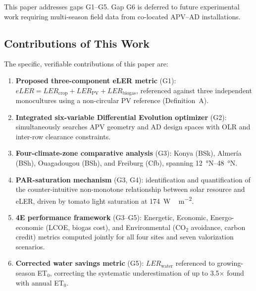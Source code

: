 This paper addresses gaps G1--G5. Gap G6 is deferred to future
experimental work requiring multi-season field data from co-located
APV--AD installations.

\subsection{Contributions of This Work}

\hspace{1cm}The specific, verifiable contributions of this paper are:

\begin{enumerate}[leftmargin=*, label=\textbf{C\arabic*:}]

    \item \textbf{Proposed three-component eLER metric} (G1): $eLER =
    LER_{\text{crop}} + LER_{\text{PV}} + LER_{\text{biogas}}$,
    referenced against three independent monocultures using a
    non-circular PV reference (Definition~A).

    \item \textbf{Integrated six-variable Differential Evolution optimizer}
    (G2): simultaneously searches APV geometry and AD design spaces
    with OLR and inter-row clearance constraints.

    \item \textbf{Four-climate-zone comparative analysis} (G3): Konya
    (BSk), Almer\'{i}a (BSh), Ouagadougou (BSh), and Freiburg (Cfb),
    spanning \SI{12}{\degree}N--\SI{48}{\degree}N.

    \item \textbf{PAR-saturation mechanism} (G3, G4): identification
    and quantification of the counter-intuitive non-monotone relationship
    between solar resource and eLER, driven by tomato light saturation
    at \SI{174}{W\,m^{-2}}.

    \item \textbf{4E performance framework} (G3--G5): Energetic,
    Economic, Energo-economic (LCOE, biogas cost), and Environmental
    (CO$_2$ avoidance, carbon credit) metrics computed jointly for
    all four sites and seven valorization scenarios.

    \item \textbf{Corrected water savings metric} (G5):
    $LER_{\text{water}}$ referenced to growing-season ET$_0$,
    correcting the systematic underestimation of up to 3.5$\times$
    found with annual ET$_0$.

\end{enumerate}

